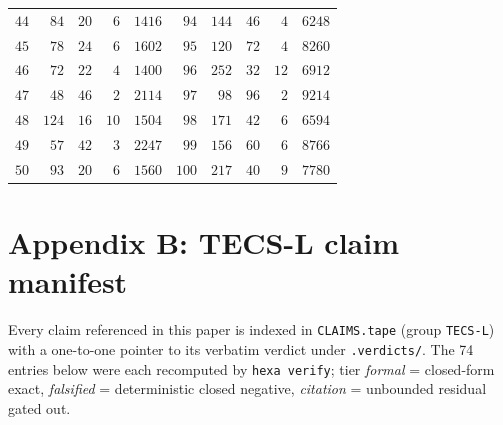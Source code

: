 \documentclass[11pt,a4paper]{article}
\theoremstyle{definition}
\begin{document}
\begin{longtable}{rrrrr@{\hskip 2em}rrrrr}
$44$ & $84$ & $20$ & $6$ & $1416$ & $94$ & $144$ & $46$ & $4$ & $6248$ \\
$45$ & $78$ & $24$ & $6$ & $1602$ & $95$ & $120$ & $72$ & $4$ & $8260$ \\
$46$ & $72$ & $22$ & $4$ & $1400$ & $96$ & $252$ & $32$ & $12$ & $6912$ \\
$47$ & $48$ & $46$ & $2$ & $2114$ & $97$ & $98$ & $96$ & $2$ & $9214$ \\
$48$ & $124$ & $16$ & $10$ & $1504$ & $98$ & $171$ & $42$ & $6$ & $6594$ \\
$49$ & $57$ & $42$ & $3$ & $2247$ & $99$ & $156$ & $60$ & $6$ & $8766$ \\
$50$ & $93$ & $20$ & $6$ & $1560$ & $100$ & $217$ & $40$ & $9$ & $7780$ \\
\bottomrule
\end{longtable}\endgroup

\section{Appendix B: TECS-L claim manifest}
\label{app:manifest}
Every claim referenced in this paper is indexed in \texttt{CLAIMS.tape} (group \texttt{TECS-L}) with a one-to-one pointer to its verbatim verdict under \texttt{.verdicts/}. The 74 entries below were each recomputed by \texttt{hexa verify}; tier \emph{formal} = closed-form exact, \emph{falsified} = deterministic closed negative, \emph{citation} = unbounded residual gated out.
\end{document}
